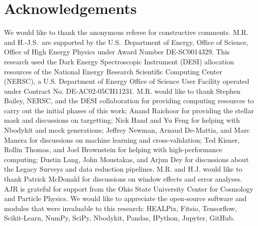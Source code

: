 
\section*{Acknowledgements}
We would like to thank the anonymous referee for constructive comments. M.R. and H.-J.S.~are supported by the U.S.~Department of Energy, Office of Science, Office of High Energy Physics under Award Number DE-SC0014329. This research used the Dark Energy Spectroscopic Instrument (DESI) allocation resources of the National Energy Research Scientific Computing Center (NERSC), a U.S. Department of Energy Office of Science User Facility operated under Contract No. DE-AC02-05CH11231. M.R. would like to thank Stephen Bailey, NERSC, and the DESI collaboration for providing computing resources to carry out the initial phases of this work; Anand Raichoor for providing the stellar mask and discussions on targetting; Nick Hand and Yu Feng for helping with Nbodykit and mock generations; Jeffrey Newman, Arnaud De-Mattia, and Marc Manera for discussions on machine learning and cross-validation; Ted Kisner, Rollin Thomas, and Joel Brownstein for helping with high-performance computing; Dustin Lang, John Moustakas, and Arjun Dey for discussions about the Legacy Surveys and data reduction pipelines. M.R. and H.J. would like to thank Patrick McDonald for discussions on window effects and error analyses. AJR is grateful for support from the Ohio State University Center for Cosmology and Particle Physics. We would like to appreciate the open-source software and modules that were invaluable to this research: HEALPix, Fitsio, Tensorflow, Scikit-Learn, NumPy, SciPy, Nbodykit, Pandas, IPython, Jupyter, GitHub.